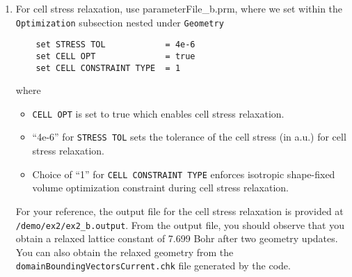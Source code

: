 \begin{enumerate}
\item For cell stress relaxation, use parameterFile\_b.prm, where we set within the \verb|Optimization| subsection nested under \verb|Geometry|
\begin{verbatim}
    set STRESS TOL            = 4e-6
    set CELL OPT              = true
    set CELL CONSTRAINT TYPE  = 1
\end{verbatim}
where
\begin{itemize}
\item \verb|CELL OPT| is set to true which enables cell stress relaxation.  		
\item ``4e-6'' for \verb|STRESS TOL| sets the tolerance of the cell stress (in a.u.) for cell stress relaxation.
\item Choice of ``1'' for \verb|CELL CONSTRAINT TYPE| enforces isotropic shape-fixed volume optimization constraint during cell stress relaxation.
\end{itemize}
For your reference, the output file for the cell stress relaxation is provided at \verb|/demo/ex2/ex2_b.output|. From the output file, you should observe that you obtain a relaxed lattice constant of 7.699 Bohr after two geometry updates. You can also obtain the relaxed geometry from the \verb|domainBoundingVectorsCurrent.chk| file generated by the code.
\end{enumerate}

